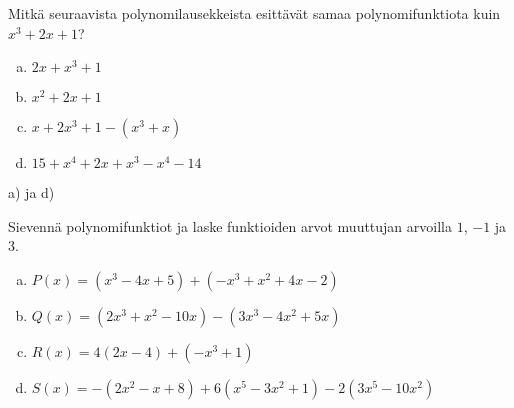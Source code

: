 \begin{tehtavasivu}
%

\begin{tehtava}
	Mitkä seuraavista polynomilausekkeista esittävät samaa polynomifunktiota kuin
	$x^3+2x+1$?
	\begin{enumerate}[a)]
		\item $2x+x^3+1$
		\item $x^2+2x+1$
		\item $x+2x^3+1 - (x^3+x)$
		\item $15+x^4+2x+x^3-x^4-14$
	\end{enumerate}
	\begin{vastaus}
		a) ja d)
	\end{vastaus}
\end{tehtava}

\begin{tehtava}
	Sievennä polynomifunktiot ja laske funktioiden arvot muuttujan arvoilla $1$, $-1$ ja $3$.
	\begin{enumerate}[a)]
		\item $P(x)=(x^3-4x+5)+(-x^3+x^2+4x-2)$
		\item $Q(x)=(2x^3+x^2-10x)-(3x^3-4x^2+5x)$
		\item $R(x)=4(2x-4)+(-x^3+1)$
		\item $S(x)=-(2x^2-x+8)+6(x^5-3x^2+1)-2(3x^5-10x^2)$
	\end{enumerate}
	

\end{tehtava}
\end{tehtavasivu}
